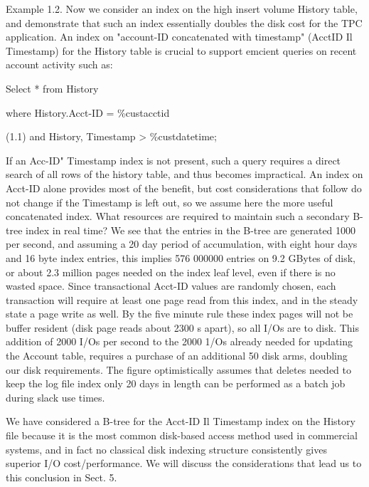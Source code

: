 \documentclass[a4paper,11pt,notitlepage,twoside,openright]{article}
\begin{document}
Example 1.2. Now we consider an index on the high insert volume History
table, and demonstrate that such an index essentially doubles the disk
cost for the TPC application. An index on "account-ID concatenated with
timestamp" (AcctID Il Timestamp) for the History table is crucial to
support emcient queries on recent account activity such as:

Select * from History

where History.Acct-ID = \%custacctid

(1.1) and History, Timestamp \textgreater{} \%custdatetime;

If an Acc-ID" Timestamp index is not present, such a query requires a
direct search of all rows of the history table, and thus becomes
impractical. An index on Acct-ID alone provides most of the benefit, but
cost considerations that follow do not change if the Timestamp is left
out, so we assume here the more useful concatenated index. What
resources are required to maintain such a secondary B-tree index in real
time? We see that the entries in the B-tree are generated 1000 per
second, and assuming a 20 day period of accumulation, with eight hour
days and 16 byte index entries, this implies 576 000000 entries on 9.2
GBytes of disk, or about 2.3 million pages needed on the index leaf
level, even if there is no wasted space. Since transactional Acct-ID
values are randomly chosen, each transaction will require at least one
page read from this index, and in the steady state a page write as well.
By the five minute rule these index pages will not be buffer resident
(disk page reads about 2300 s apart), so all I/Os are to disk. This
addition of 2000 I/Os per second to the 2000 1/Os already needed for
updating the Account table, requires a purchase of an additional 50 disk
arms, doubling our disk requirements. The figure optimistically assumes
that deletes needed to keep the log file index only 20 days in length
can be performed as a batch job during slack use times.

We have considered a B-tree for the Acct-ID Il Timestamp index on the
History file because it is the most common disk-based access method used
in commercial systems, and in fact no classical disk indexing structure
consistently gives superior I/O cost/performance. We will discuss the
considerations that lead us to this conclusion in Sect. 5.
\end{document}
